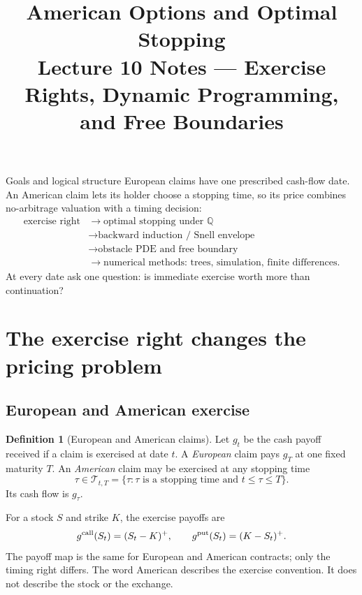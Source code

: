 \documentclass[10pt]{article}
\title{\textbf{American Options and Optimal Stopping}\\
\large Lecture 10 Notes --- Exercise Rights, Dynamic Programming, and Free Boundaries}
\author{}\date{}
\newcommand{\Q}{\mathbb Q}
\newcommand{\1}{\mathbf 1}
\theoremstyle{definition}
\newtheorem{definition}{Definition}[section]
\begin{document}
\maketitle
\vspace{-1.4em}

\begin{keyidea}{Goals and logical structure}
European claims have one prescribed cash-flow date. An American claim lets
its holder choose a stopping time, so its price combines no-arbitrage
valuation with a timing decision:
\[
\begin{aligned}
\text{exercise right}&\longrightarrow\text{optimal stopping under }\Q\\
&\longrightarrow\text{backward induction / Snell envelope}\\
&\longrightarrow\text{obstacle PDE and free boundary}\\
&\longrightarrow\text{numerical methods: trees, simulation, finite differences}.
\end{aligned}
\]
At every date ask one question: is immediate exercise worth more than
continuation?
\end{keyidea}

\section{The exercise right changes the pricing problem}

\subsection{European and American exercise}

\begin{definition}[European and American claims]
Let \(g_t\) be the cash payoff received if a claim is exercised at date
\(t\). A \emph{European} claim pays \(g_T\) at one fixed maturity \(T\).
An \emph{American} claim may be exercised at any stopping time
\[
\tau\in\mathcal T_{t,T}
=\{\tau:\tau\text{ is a stopping time and }t\leq\tau\leq T\}.
\]
Its cash flow is \(g_\tau\).
\end{definition}

For a stock \(S\) and strike \(K\), the exercise payoffs are
\[
g^{\rm call}(S_t)=(S_t-K)^+,\qquad
g^{\rm put}(S_t)=(K-S_t)^+.
\]
The payoff map is the same for European and American contracts; only the
timing right differs. The word American describes the exercise convention.
It does not describe the stock or the exchange.
\end{document}
